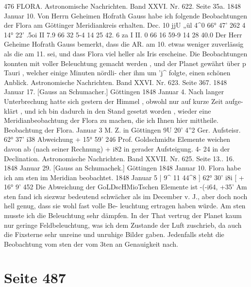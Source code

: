 \documentclass[10pt,a4paper]{article}
\begin{document}
476  FLORA.
Astronomische  Nachrichten.     Band  XXVI.  Nr.  622.  Seite  35a.     1848  Januar  10.
Von  Herrn  Geheimen  Hofrath  Gauss   habe   ich  folgende  Beobachtungen   der  Flora  am  Göttinger
Meridiankreis  erhalten.
Dec.  10
jjU  „ül
4\textasciicircum{}0
66°  47'
26\glqq{}2
4  14°  22'
.5o\glqq{}i
II
7.9
66  32
5-4
14  25
42.  6
za
I
II. 0
66  16
59-9
14  28
40.0
Der  Herr  Geheime  Hofrath  Gauss  bemerkt,  dass  die  AR.  am  10.  etwas  weniger  zuverlässig  als
die  am  11.  sei,  und  dass  Flora  viel  heller  als  Iris  erscheine.  Die  Beobachtungen  konnten  mit  voller
Beleuchtung  gemacht  werden ,  und  der  Planet  gewährt  über  p  Tauri ,  welcher  einige  Minuten  nördli-
cher ihm  um  'j\textasciicircum{}  folgte,  einen  schönen  Anblick.
Astronomische  Nachrichten.     Band  XXVI.  Nr.  623.  Seite  367.     1848  Januar  17.
[Gauss  an  Schumacher.]     Göttingen  1848  Januar  4.
Nach  langer  Unterbrechung  hatte  sich  gestern  der  Himmel ,  obwohl  nur  auf  kurze  Zeit  aufge-
klärt ,  und  ich  bin  dadurch  in  den  Stand  gesetzt  worden ,  wieder  eine  Meridianbeobachtung  der  Flora
zu  machen,  die  ich  Ihnen  hier  mittheile.
Beobachtung  der  Flora.
Januar  3
M.  Z.  in  Göttingen
9U    20\glqq{}'    4''2
Ger.  Aufsteisr.
62°  37'  i3\glqq{}8
Abweichung
+  15°  59'  24\glqq{}6
Prof.  Goldschmidts  Elemente  weichen  davon  ab  (nach  seiner  Rechnung)
+  i8\glqq{}2  in  gerader  Aufsteigung.  4-  2\glqq{}4  in  der  Declination.
Astronomische  Nachrichten.     Band  XXVII.  Nr.  625.  Seite  13..  16.     1848  Januar  29.
[Gauss  an  Schumachek.]     Göttingen  1848  Januar  10.
Flora  habe  ich  am  sten  im  Meridian  beobachtet.
1848  Januar  5     |     9\textasciicircum{}  11\glqq{}  44\textasciicircum{}8     ]     62°  30'  i8\glqq{}i     [     + 16°  9'  45\glqq{}2
Die  Abweichung  der  GoLDscHMioTschen  Elemente  ist  -(-i6\glqq{}4,  +3\glqq{}5'  Am  sten  fand  ich  siezwar
bedeutend  schwächer  als  im  December  v.  J.,  aber  doch  noch  hell  genug,  dass  sie  wohl  fast  volle  Be-
leuchtung ertragen  haben  würde.  Am  sten  musste  ich  die  Beleuchtung  sehr  dämpfen.  In  der  That
vertrug  der  Planet  kaum  nur  geringe  Feldbeleuchtung,  was  ich  dem  Zustande  der  Luft  zuschrieb,  da
auch  die  Fixsterne  sehr  unreine  und  unruhige  Bilder  gaben.  Jedenfalls  steht  die  Beobachtung  vom  sten
der  vom  3ten  an  Genauigkeit  nach.

\newpage
\section*{Seite 487}
\end{document}
